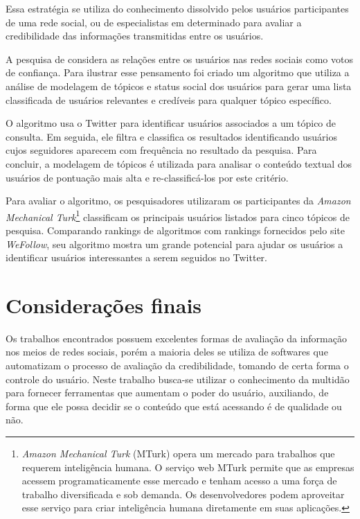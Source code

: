 Essa estratégia se utiliza do conhecimento dissolvido pelos usuários participantes de uma rede social, ou de especialistas em determinado para avaliar a credibilidade das informações transmitidas entre os usuários.

A pesquisa de \cite{canini_finding_2011} considera as relações entre os usuários nas redes sociais como votos de confiança. Para ilustrar esse pensamento foi criado um algoritmo que utiliza a análise de modelagem de tópicos e status social dos usuários para gerar uma lista classificada de usuários relevantes e credíveis para qualquer tópico específico.

O algoritmo usa o Twitter para identificar usuários associados a um tópico de consulta. Em seguida, ele filtra e classifica os resultados identificando usuários cujos seguidores aparecem com frequência no resultado da pesquisa. Para concluir, a modelagem de tópicos é utilizada para analisar o conteúdo textual dos usuários de pontuação mais alta e re-classificá-los por este critério.

Para avaliar o algoritmo, os pesquisadores utilizaram os participantes da \emph{Amazon Mechanical Turk}\footnote{\emph{Amazon Mechanical Turk} (MTurk) opera um mercado para trabalhos que requerem inteligência humana. O serviço web MTurk permite que as empresas acessem programaticamente esse mercado e tenham acesso a uma força de trabalho diversificada e sob demanda. Os desenvolvedores podem aproveitar esse serviço para criar inteligência humana diretamente em suas aplicações.} classificam os principais usuários listados para cinco tópicos de pesquisa. Comparando rankings de algoritmos com rankings fornecidos pelo site \emph{WeFollow}, seu algoritmo mostra um grande potencial para ajudar os usuários a identificar usuários interessantes a serem seguidos no Twitter.

\section{Considerações finais}

Os trabalhos encontrados possuem excelentes formas de avaliação da informação nos meios de redes sociais, porém a maioria deles se utiliza de softwares que automatizam o processo de avaliação da credibilidade, tomando de certa forma o controle do usuário. Neste trabalho busca-se utilizar o conhecimento da multidão para fornecer ferramentas que aumentam o poder do usuário, auxiliando, de forma que ele possa decidir se o conteúdo que está acessando é de qualidade ou não.
